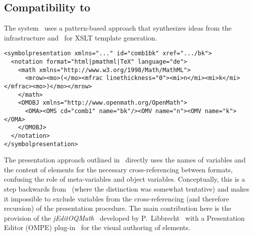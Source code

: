 \subsection{Compatibility to {\activemath}}

  The {\activemath} system~\cite{URL:activemath} uses a pattern-based approach that
  synthesizes ideas from the {} infrastructure and~\cite{Naylor:conversion}
  for XSLT template generation.
\begin{lstlisting} 
<symbolpresentation xmlns="..." id="comb1bk" xref=".../bk">
  <notation format="html|pmathml|TeX" language="de">
    <math xmlns="http://www.w3.org/1998/Math/MathML">
      <mrow><mo>(</mo><mfrac linethickness="0"><mi>n</mi><mi>k</mi></mfrac><mo>)</mo></mrow> 
    </math>
    <OMOBJ xmlns="http://www.openmath.org/OpenMath">
      <OMA><OMS cd="comb1" name="bk"/><OMV name="n"><OMV name="k"></OMA>
    </OMOBJ>
  </notation>
</symbolpresentation>
\end{lstlisting}
  The presentation approach outlined in~\cite{ManLib:apo05} directly uses the names of
  {\openmath} variables and the content of {\mathml} {} elements for the
  necessary cross-referencing between formats, confusing the role of meta-variables and
  object variables. Conceptually, this is a step backwards from~\cite{Naylor:conversion}
  (where the distinction was somewhat tentative) and makes it impossible to exclude
  variables from the cross-referencing (and therefore recursion) of the presentation
  procedure. The main contribution here is the provision of the
  {\textit{jEditOQMath}}~\cite{jeditoqmath:web} developed by P.\
  Libbrecht~\cite{Lib:authoring} with a {\openmath} Presentation Editor (OMPE)
  plug-in~\cite{oqmath:web} for the visual authoring of {}
  elements.

